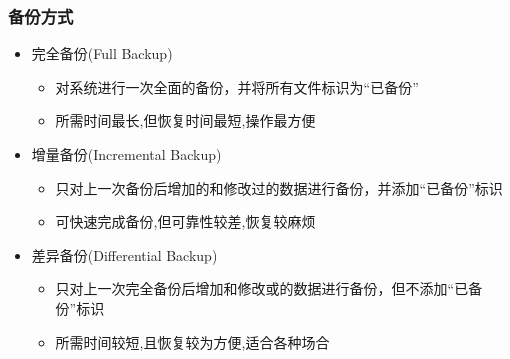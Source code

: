 \documentclass[xcolor=svgnames,presentation]{beamer}
\begin{document}
\begin{frame}
\frametitle{备份方式}
\label{sec-7-3}
\begin{itemize}

\item 完全备份(Full Backup)
\label{sec-7-3-1}%
\begin{itemize}

\item 对系统进行一次全面的备份，并将所有文件标识为“已备份”
\label{sec-7-3-1-1}%

\item 所需时间最长,但恢复时间最短,操作最方便
\label{sec-7-3-1-2}%
\end{itemize} %

\item 增量备份(Incremental Backup)
\label{sec-7-3-2}%
\begin{itemize}

\item 只对上一次备份后增加的和修改过的数据进行备份，并添加“已备份”标识
\label{sec-7-3-2-1}%

\item 可快速完成备份,但可靠性较差,恢复较麻烦
\label{sec-7-3-2-2}%
\end{itemize} %

\item 差异备份(Differential Backup)
\label{sec-7-3-3}%
\begin{itemize}

\item 只对上一次完全备份后增加和修改或的数据进行备份，但不添加“已备份”标识
\label{sec-7-3-3-1}%

\item 所需时间较短,且恢复较为方便,适合各种场合
\label{sec-7-3-3-2}%
\end{itemize} %
\end{itemize} %
\end{frame}
\end{document}
